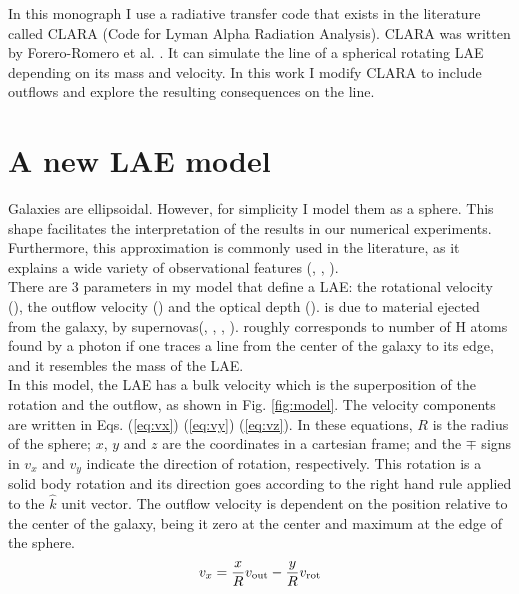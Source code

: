\documentclass{latex/emulateapj}
\begin{document}
In this monograph I use a radiative transfer code that exists in the literature called CLARA (Code for Lyman Alpha Radiation Analysis). CLARA was written by Forero-Romero et al. \cite{CLARA}. It can simulate the \lya line of a spherical rotating LAE depending on its mass and velocity. In this work I modify CLARA to include outflows and explore the resulting consequences on the \lya line. \\


\section{A new LAE model}

\label{sec:newmodel}
Galaxies are ellipsoidal. However, for simplicity I model them as a sphere. This shape facilitates the interpretation of the results in our numerical experiments. Furthermore, this approximation is commonly used in the literature, as it explains a wide variety of observational features (\cite{Ahn03}, \cite{Verhamme06}, \cite{Dijkstra06}). \\

There are 3 parameters in my model that define a LAE: the rotational velocity (\vrot), the outflow velocity (\vout) and the optical depth (\tauh). \vout is due to material ejected from the galaxy, by supernovas(\cite{Verhamme06}, \cite{Orsi12}, \cite{Hashimoto2015}, \cite{Gronke2015}). \tauh roughly corresponds to number of H atoms found by a \lya photon if one traces a line from the center of the galaxy to its edge, and it resembles the mass of the LAE.\\

In this model, the LAE has a bulk velocity which is the superposition of the rotation and the outflow, as shown in Fig. \ref{fig:model}. The velocity components are written in Eqs. (\ref{eq:vx}) (\ref{eq:vy}) (\ref{eq:vz}). In these equations, $R$ is the radius of the sphere; $x$, $y$ and $z$ are the coordinates in a cartesian frame; and the $\mp$ signs in $v_x$ and $v_y$ indicate the direction of rotation, respectively. This rotation is a solid body rotation and its direction goes according to the right hand rule applied to the $\hat{k}$ unit vector. The outflow velocity is dependent on the position relative to the center of the galaxy, being it zero at the center and maximum at the edge of the sphere.\\

\begin{equation}
	v_{x}=\frac{x}{R}v_{\rm out}-\frac{y}{R}v_{\rm rot} 
	\label{eq:vx}
\end{equation}
\end{document}
